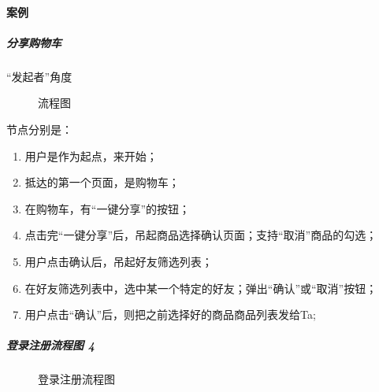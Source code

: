 \documentclass[letterpaper,11pt,english]{sphinxmanual}
\begin{document}
\paragraph{案例}
\label{\detokenize{chapter_knowledge/flow_chart:id18}}

\subparagraph{分享购物车}
\label{\detokenize{chapter_knowledge/flow_chart:id19}}
“发起者”角度

\begin{figure}[H]
\centering
\capstart

\noindent{}
\caption{流程图}\label{\detokenize{chapter_knowledge/flow_chart:id40}}\end{figure}

节点分别是：
%
\begin{footnote}[512]\sphinxAtStartFootnote
{}
%
\end{footnote}
\begin{enumerate}
%
\item {} 
用户是作为起点，来开始；

\item {} 
抵达的第一个页面，是购物车；

\item {} 
在购物车，有“一键分享”的按钮；

\item {} 
点击完“一键分享”后，吊起商品选择确认页面；支持“取消”商品的勾选；

\item {} 
用户点击确认后，吊起好友筛选列表；

\item {} 
在好友筛选列表中，选中某一个特定的好友；弹出“确认”或“取消”按钮；

\item {} 
用户点击“确认”后，则把之前选择好的商品商品列表发给Ta;

\end{enumerate}


\subparagraph{登录注册流程图 4\sphinxfootnotemark[513]}
\label{\detokenize{chapter_knowledge/flow_chart:id20}}%
\begin{footnotetext}[513]\sphinxAtStartFootnote
{}
%
\end{footnotetext}\ignorespaces 
\begin{figure}[H]
\centering
\capstart

\noindent{}
\caption{登录注册流程图}\label{\detokenize{chapter_knowledge/flow_chart:id41}}\end{figure}
\end{document}
